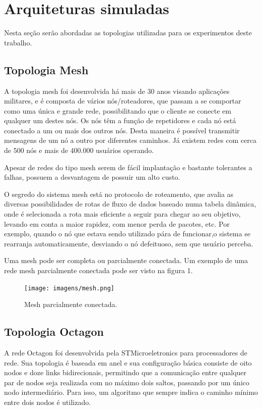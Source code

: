 \documentclass[12pt]{article}
\begin{document}
\section{Arquiteturas simuladas} \label{sec:arqsi}
Nesta seção serão abordadas as topologias utilizadas para os experimentos deste trabalho.

\subsection{Topologia Mesh}
A topologia mesh foi desenvolvida há mais de 30 anos visando aplicações militares, e é composta de vários nós/roteadores, que passam a se comportar como uma única e grande rede, possibilitando que o cliente se conecte em qualquer um destes nós. Os nós têm a função de repetidores e cada nó está conectado a um ou mais dos outros nós. Desta maneira é possível transmitir mensagens de um nó a outro por diferentes caminhos. Já existem redes com cerca de 500 nós e mais de 400.000 usuários operando.

Apesar de redes do tipo mesh serem de fácil implantação e bastante tolerantes a falhas, possuem a desvantagem de possuir um alto custo.

O segredo do sistema mesh está no protocolo de roteamento, que avalia as diversas possibilidades de rotas de fluxo de dados baseado numa tabela dinâmica, onde é selecionada a rota mais eficiente a seguir para chegar ao seu objetivo, levando em conta a maior rapidez, com menor perda de pacotes, etc. Por exemplo, quando o nó que estava sendo utilizado pára de funcionar,o sistema se rearranja automaticamente, desviando o nó defeituoso, sem que usuário perceba.

Uma mesh pode ser completa ou parcialmente conectada. Um exemplo de uma rede mesh parcialmente conectada pode ser visto na figura 1.

\begin{figure}[H]
\centering
\texttt{[image: imagens/mesh.png]}
\label{meshparcial}
\caption{Mesh parcialmente conectada.}
\end{figure}

\subsection{Topologia Octagon}
A rede Octagon foi desenvolvida pela STMicroeletronics para processadores de rede. Sua topologia é baseada em anel e sua configuração básica consiste de oito nodos e doze links bidirecionais, permitindo que a
comunicação entre qualquer par de nodos seja realizada com no máximo dois saltos, passando por um único nodo intermediário. Para isso, um algoritmo que sempre indica o caminho mínimo entre dois nodos é utilizado. 
\end{document}
